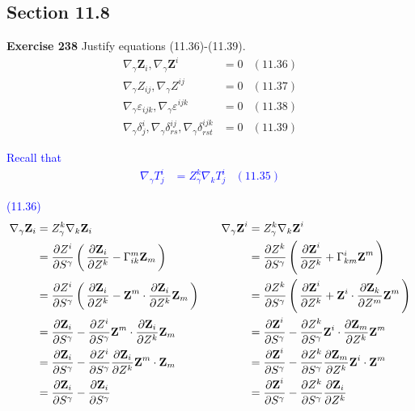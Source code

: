 \documentclass[12pt,a4paper]{report}
\newcommand{\BLUE}[1]{\textcolor{blue}{#1}}
\begin{document}
\begin{description}
\section*{Section 11.8}
\item \textbf{Exercise 238} Justify equations (11.36)-(11.39).\begin{align*}
	\nabla_\gamma\textbf{Z}_i, \nabla_\gamma\textbf{Z}^i &= 0 &  (11.36)\\
	\nabla_\gamma Z_{ij}, \nabla_\gamma Z^{ij} &=0 & (11.37) \\
	\nabla_\gamma\varepsilon_{ijk}, \nabla_\gamma\varepsilon^{ijk} &= 0 & (11.38)\\
	\nabla_\gamma\delta_j^i, \nabla_\gamma\delta_{rs}^{ij}, \nabla_\gamma\delta_{rst}^{ijk} &= 0 & (11.39) 
\end{align*}
\BLUE{Recall that \begin{align*}
	\nabla_\gamma T_j^i &= Z_\gamma^k\nabla_kT_j^i & (11.35)
\end{align*}
\begin{description}
	\item (11.36)
	\begin{align*}
	\nabla_\gamma\textbf{Z}_i &= Z_\gamma^k \nabla_k \textbf{Z}_i & 
		&& \nabla_\gamma\textbf{Z}^i &= Z_\gamma^k \nabla_k  \textbf{Z}^i \\
	&= \PART{Z^i}{S^\gamma} \PAREN{\PART{\textbf{Z}_i}{Z^k} - \Gamma^m_{ik}\textbf{Z}_m} &
		&&  &= \PART{Z^k}{S^\gamma} \PAREN{\PART{\textbf{Z}^i}{Z^k} + \Gamma^i_{km}\textbf{Z}^m}\\
	&= \PART{Z^i}{S^\gamma} \PAREN{\PART{\textbf{Z}_i}{Z^k} - \textbf{Z}^m\cdot\PART{\textbf{Z}_i}{Z^k}\textbf{Z}_m} &
		&&  &= \PART{Z^k}{S^\gamma} \PAREN{\PART{\textbf{Z}^i}{Z^k} + \textbf{Z}^i\cdot\PART{\textbf{Z}_k}{Z^m}\textbf{Z}^m}\\ 
	&=  \PART{\textbf{Z}_i}{S^\gamma} - \PART{Z^i}{S^\gamma} \textbf{Z}^m\cdot\PART{\textbf{Z}_i}{Z^k}\textbf{Z}_m &
		&&  &= \PART{\textbf{Z}^i}{S^\gamma}  - \PART{Z^k}{S^\gamma}\textbf{Z}^i\cdot\PART{\textbf{Z}_m}{Z^k}\textbf{Z}^m\\ 
	&=  \PART{\textbf{Z}_i}{S^\gamma} - \PART{Z^i}{S^\gamma} \PART{\textbf{Z}_i}{Z^k}\textbf{Z}^m\cdot\textbf{Z}_m &
		&&  &= \PART{\textbf{Z}^i}{S^\gamma}  - \PART{Z^k}{S^\gamma}\PART{\textbf{Z}_m}{Z^k}\textbf{Z}^i\cdot\textbf{Z}^m\\
	&=  \PART{\textbf{Z}_i}{S^\gamma} -  \PART{\textbf{Z}_i}{S^\gamma} &
		&&  &= \PART{\textbf{Z}^i}{S^\gamma}  - \PART{Z^k}{S^\gamma}\PART{\textbf{Z}_i}{Z^k}\\

\end{align*}
\end{description}}
\end{description}
\end{document}
